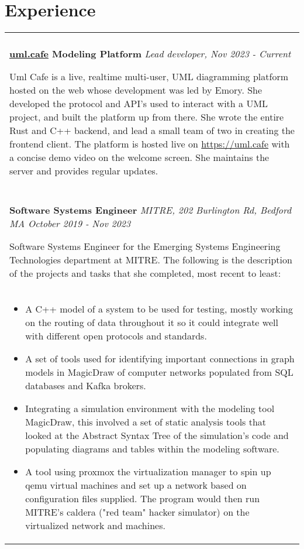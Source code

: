 \documentclass[11pt]{article}
\begin{document}
\section*{Experience}
\begin{tabular}{p{18.5cm}}
    \hline
    \multicolumn{1}{c}{} \\

     \large \textbf{\href{https://uml.cafe}{uml.cafe} Modeling Platform} \normalsize \textit{Lead developer, \hfill Nov 2023 - Current}

     \> Uml Cafe is a live, realtime multi-user, UML diagramming platform hosted on the web whose development was led 
     by Emory. She developed the protocol and API's used to interact with a UML project, and built the platform up from there. She wrote the
     entire Rust and C++ backend, and lead a small team of two in creating the frontend client. The platform is hosted live on 
     \url{https://uml.cafe} with a concise demo video on the welcome screen. She maintains the server and provides regular updates.\\
 
     \multicolumn{1}{c}{} \\

    \large \textbf{Software Systems Engineer} \normalsize \textit{MITRE, 202 Burlington Rd, Bedford MA \hfill October 2019 - Nov 2023}

    \> Software Systems Engineer for the Emerging Systems Engineering Technologies department at MITRE. The following is the 
    description of the projects and tasks that she completed, most recent to least:\\ 

    \begin{itemize}[noitemsep,topsep=0pt]
      \item A C++ model of a system to be used for testing, mostly working on the routing of data throughout it so it could 
      integrate well with different open protocols and standards.
      \item A set of tools used for identifying important connections in graph models in MagicDraw of computer networks populated from SQL 
      databases and Kafka brokers.
      \item Integrating a simulation environment with the modeling tool MagicDraw, this involved 
      a set of static analysis tools that looked at the Abstract Syntax Tree of the simulation's code and populating diagrams and 
      tables within the modeling software.
      \item A tool using proxmox the virtualization manager to spin up qemu virtual machines and 
      set up a network based on configuration files supplied. The program would then run MITRE's caldera ("red team" hacker simulator) on 
      the virtualized network and machines.
    \end{itemize}\\


\end{tabular}
\end{document}
